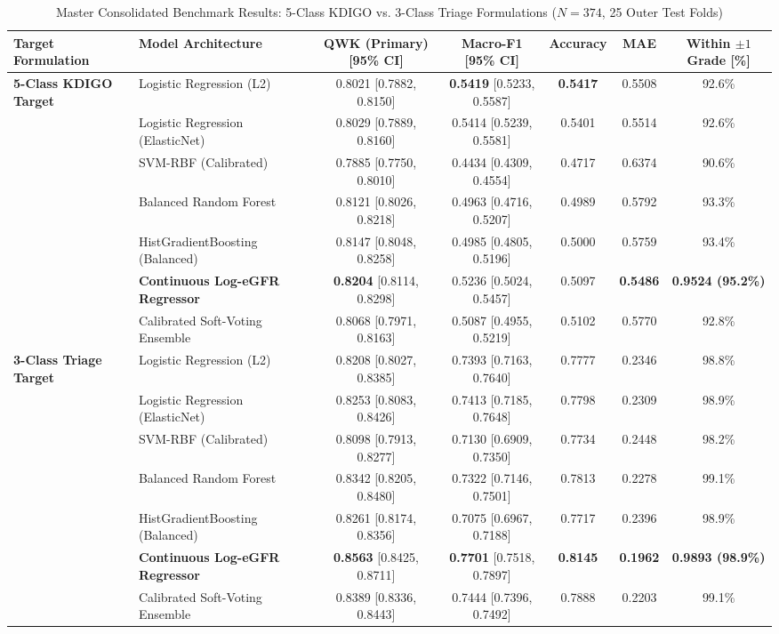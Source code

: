 \documentclass[conference]{IEEEtran}
\begin{document}
\begin{table}[t]
\centering
\caption{Master Consolidated Benchmark Results: 5-Class KDIGO vs. 3-Class Triage Formulations ($N = 374$, 25 Outer Test Folds)}
\label{tab:master_benchmark}
\renewcommand{\arraystretch}{1.06}
\footnotesize
\begin{tabular*}{\textwidth}{@{\extracolsep{\fill}}llccccc@{}}
\toprule
\textbf{Target Formulation} & \textbf{Model Architecture} & \textbf{QWK (Primary) [95\% CI]} & \textbf{Macro-F1 [95\% CI]} & \textbf{Accuracy} & \textbf{MAE} & \textbf{Within $\pm 1$ Grade [\%]} \\
\midrule
\multirow{7}{*}{\textbf{5-Class KDIGO Target}} 
& Logistic Regression (L2) & 0.8021 [0.7882, 0.8150] & \textbf{0.5419} [0.5233, 0.5587] & \textbf{0.5417} & 0.5508 & 92.6\% \\
& Logistic Regression (ElasticNet) & 0.8029 [0.7889, 0.8160] & 0.5414 [0.5239, 0.5581] & 0.5401 & 0.5514 & 92.6\% \\
& SVM-RBF (Calibrated) & 0.7885 [0.7750, 0.8010] & 0.4434 [0.4309, 0.4554] & 0.4717 & 0.6374 & 90.6\% \\
& Balanced Random Forest & 0.8121 [0.8026, 0.8218] & 0.4963 [0.4716, 0.5207] & 0.4989 & 0.5792 & 93.3\% \\
& HistGradientBoosting (Balanced) & 0.8147 [0.8048, 0.8258] & 0.4985 [0.4805, 0.5196] & 0.5000 & 0.5759 & 93.4\% \\
& \textbf{Continuous Log-eGFR Regressor} & \textbf{0.8204} [0.8114, 0.8298] & 0.5236 [0.5024, 0.5457] & 0.5097 & \textbf{0.5486} & \textbf{0.9524 (95.2\%)} \\
& Calibrated Soft-Voting Ensemble & 0.8068 [0.7971, 0.8163] & 0.5087 [0.4955, 0.5219] & 0.5102 & 0.5770 & 92.8\% \\
\midrule
\multirow{7}{*}{\textbf{3-Class Triage Target}} 
& Logistic Regression (L2) & 0.8208 [0.8027, 0.8385] & 0.7393 [0.7163, 0.7640] & 0.7777 & 0.2346 & 98.8\% \\
& Logistic Regression (ElasticNet) & 0.8253 [0.8083, 0.8426] & 0.7413 [0.7185, 0.7648] & 0.7798 & 0.2309 & 98.9\% \\
& SVM-RBF (Calibrated) & 0.8098 [0.7913, 0.8277] & 0.7130 [0.6909, 0.7350] & 0.7734 & 0.2448 & 98.2\% \\
& Balanced Random Forest & 0.8342 [0.8205, 0.8480] & 0.7322 [0.7146, 0.7501] & 0.7813 & 0.2278 & 99.1\% \\
& HistGradientBoosting (Balanced) & 0.8261 [0.8174, 0.8356] & 0.7075 [0.6967, 0.7188] & 0.7717 & 0.2396 & 98.9\% \\
& \textbf{Continuous Log-eGFR Regressor} & \textbf{0.8563} [0.8425, 0.8711] & \textbf{0.7701} [0.7518, 0.7897] & \textbf{0.8145} & \textbf{0.1962} & \textbf{0.9893 (98.9\%)} \\
& Calibrated Soft-Voting Ensemble & 0.8389 [0.8336, 0.8443] & 0.7444 [0.7396, 0.7492] & 0.7888 & 0.2203 & 99.1\% \\
\bottomrule
\end{tabular*}
\end{table}
\end{document}
